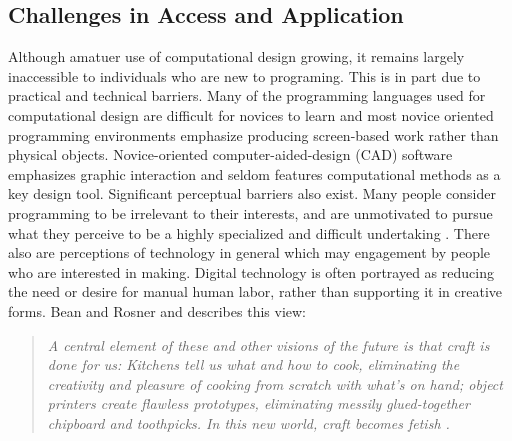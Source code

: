 \documentclass{sigchi}
\begin{document}
\subsection{Challenges in Access and Application}
Although amatuer use of computational design growing, it remains largely inaccessible to individuals who are new to programing. This is in part due to practical and technical barriers. Many of the programming languages used for computational design are difficult for novices to learn and most novice oriented programming environments emphasize producing screen-based work rather than physical objects. Novice-oriented computer-aided-design (CAD) software emphasizes graphic interaction and seldom features computational methods as a key design tool. Significant perceptual barriers also exist. Many people consider programming to be irrelevant to their interests, and are unmotivated to pursue what they perceive to be a highly specialized and difficult undertaking \cite{resnick1}. There also are perceptions of technology in general which may engagement by people who are interested in making. Digital technology is often portrayed as reducing the need or desire for manual human labor, rather than supporting it in creative forms. Bean and Rosner and describes this view:

\begin{quotation}
 \textit{A central element of these and other visions of the future is that craft is done for us: Kitchens tell us what and how to cook, eliminating the creativity and pleasure of cooking from scratch with what's on hand; object printers create flawless prototypes, eliminating messily glued-together chipboard and toothpicks. In this new world, craft becomes fetish \cite{rosner_craft_vs_design}.}
\end{quotation}
\end{document}
